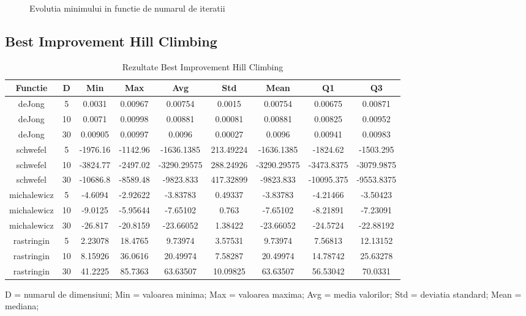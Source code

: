 \documentclass{article}
\begin{document}
\begin{figure}
    \qquad
    \caption{Evolutia minimului in functie de numarul de iteratii}%
    \label{tab:example}
\end{figure}
\clearpage
\subsection{Best Improvement Hill Climbing}
\begin{table}[h]
\begin{tabular}{ccccccccc}
\hline
Functie&D&Min&Max&Avg&Std&Mean&Q1&Q3\\
\hline
\hline
deJong&5&0.0031&0.00967&0.00754&0.0015&0.00754&0.00675&0.00871 \\ \hline
deJong&10&0.0071&0.00998&0.00881&0.00081&0.00881&0.00825&0.00952 \\ \hline
deJong&30&0.00905&0.00997&0.0096&0.00027&0.0096&0.00941&0.00983 \\ \hline
\hline
schwefel&5&-1976.16&-1142.96&-1636.1385&213.49224&-1636.1385&-1824.62&-1503.295 \\ \hline
schwefel&10&-3824.77&-2497.02&-3290.29575&288.24926&-3290.29575&-3473.8375&-3079.9875 \\ \hline
schwefel&30&-10686.8&-8589.48&-9823.833&417.32899&-9823.833&-10095.375&-9553.8375 \\ \hline
\hline
michalewicz&5&-4.6094&-2.92622&-3.83783&0.49337&-3.83783&-4.21466&-3.50423 \\ \hline
michalewicz&10&-9.0125&-5.95644&-7.65102&0.763&-7.65102&-8.21891&-7.23091 \\ \hline
michalewicz&30&-26.817&-20.8159&-23.66052&1.38422&-23.66052&-24.5724&-22.88192 \\ \hline
\hline
rastringin&5&2.23078&18.4765&9.73974&3.57531&9.73974&7.56813&12.13152 \\ \hline
rastringin&10&8.15926&36.0616&20.49974&7.58287&20.49974&14.78742&25.63278 \\ \hline
rastringin&30&41.2225&85.7363&63.63507&10.09825&63.63507&56.53042&70.0331 \\ \hline
\hline
\end{tabular}
\caption{Rezultate Best Improvement Hill Climbing} \footnotesize{D = numarul de dimensiuni}; {Min = valoarea minima}; {Max = valoarea maxima}; {Avg = media valorilor}; {Std = deviatia standard}; {Mean = mediana};
\end{table}
\end{document}
